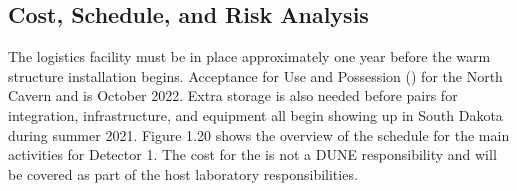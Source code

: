 \subsection{Cost, Schedule, and Risk Analysis}
\label{sec:fdsp-tc-log-cost}


The logistics facility must be in place approximately one year before the warm structure installation begins.  
Acceptance for Use and Possession () for the North Cavern and  is October 2022.  
Extra storage is also needed before  pairs for integration,  infrastructure, and equipment all begin showing up in  South Dakota during summer 2021. 
Figure 1.20 shows the overview of the schedule for the main activities for Detector 1. 
The cost for the  is not a DUNE responsibility and will be covered as part of the host laboratory responsibilities.


